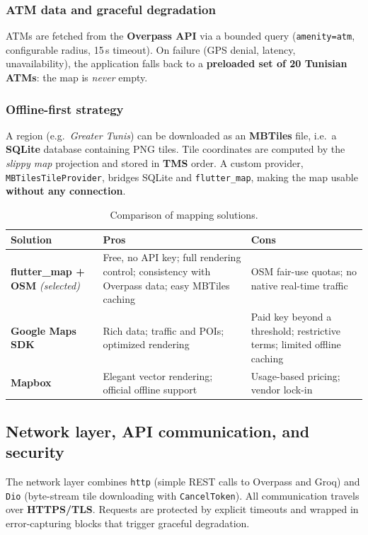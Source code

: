 \documentclass[11pt,a4paper]{article}
\newcommand{\code}[1]{\texttt{#1}}
\begin{document}
\subsubsection{ATM data and graceful degradation}
ATMs are fetched from the \textbf{Overpass API} via a bounded query
(\code{amenity=atm}, configurable radius, 15\,s timeout). On failure (GPS
denial, latency, unavailability), the application falls back to a
\textbf{preloaded set of 20 Tunisian ATMs}: the map is \emph{never} empty.

\subsubsection{Offline-first strategy}
A region (e.g.\ \textit{Greater Tunis}) can be downloaded as an \textbf{MBTiles}
file, i.e.\ a \textbf{SQLite} database containing PNG tiles. Tile coordinates are
computed by the \emph{slippy map} projection and stored in \textbf{TMS} order. A
custom provider, \code{MBTilesTileProvider}, bridges SQLite and
\code{flutter\_map}, making the map usable \textbf{without any connection}.

\begin{table}[ht]
\centering
\caption{Comparison of mapping solutions.}
\label{tab:maps-en}
\small
\begin{tabular}{>{\raggedright\arraybackslash}p{3.0cm} >{\raggedright\arraybackslash}p{5.2cm} >{\raggedright\arraybackslash}p{5.2cm}}
\toprule
\textbf{Solution} & \textbf{Pros} & \textbf{Cons} \\
\midrule
\textbf{flutter\_map + OSM} \textit{(selected)} &
Free, no API key; full rendering control; consistency with Overpass data; easy
MBTiles caching &
OSM fair-use quotas; no native real-time traffic \\
\midrule
\textbf{Google Maps SDK} &
Rich data; traffic and POIs; optimized rendering &
Paid key beyond a threshold; restrictive terms; limited offline caching \\
\midrule
\textbf{Mapbox} &
Elegant vector rendering; official offline support &
Usage-based pricing; vendor lock-in \\
\bottomrule
\end{tabular}
\end{table}

\subsection{Network layer, API communication, and security}
The network layer combines \code{http} (simple REST calls to Overpass and Groq)
and \code{Dio} (byte-stream tile downloading with \code{CancelToken}). All
communication travels over \textbf{HTTPS/TLS}. Requests are protected by
explicit timeouts and wrapped in error-capturing blocks that trigger graceful
degradation.
\end{document}
